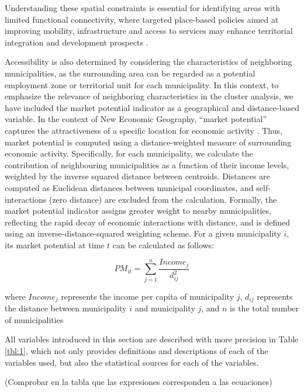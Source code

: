 \documentclass[a4paper,11pt,oneside]{article}
\begin{document}
Understanding these spatial constraints is essential for identifying areas with limited functional connectivity, where targeted place-based policies aimed at improving mobility, infrastructure and access to services may enhance territorial integration and development prospects \citep{paez2012measuring,Mustafa2025}.


Accessibility is also determined by considering the characteristics of neighboring municipalities, as the surrounding area can be regarded as a potential employment zone or territorial unit for each municipality. In this context, to emphasize the relevance of neighboring characteristics in the cluster analysis, we have included the market potential indicator as a geographical and distance-based variable. In the context of New Economic Geography, ``market potential'' captures the attractiveness of a specific location for economic activity \citep{krugman1991increasing,harris1954market}. Thus, market potential is computed using a distance-weighted measure of surrounding economic activity. Specifically, for each municipality, we calculate the contribution of neighbouring municipalities as a function of their income levels, weighted by the inverse squared distance between centroids. Distances are computed as Euclidean distances between municipal coordinates, and self-interactions (zero distance) are excluded from the calculation. Formally, the market potential indicator assigns greater weight to nearby municipalities, reflecting the rapid decay of economic interactions with distance, and is defined using an inverse-distance-squared weighting scheme. For a given municipality $i$, its market potential at time $t$ can be calculated as follows:

\begin{equation}
    \label{eq:eq10}
    PM_{it} = \sum_{j=1}^{n} \frac{Income_{j}}{d_{ij}^2}
\end{equation}

\noindent where $Income_{j}$ represents the income per capita of municipality $j$, $d_{ij}$ represents the distance between municipality $i$ and municipality $j$, and $n$ is the total number of municipalities


All variables introduced in this section are described with more precision in Table \ref{tbl:1}, which not only provides definitions and descriptions of each of the variables used, but also the statistical sources for each of the variables.

{\color{red} (Comprobar en la tabla que las expresiones corresponden a las ecuaciones)}
\end{document}

